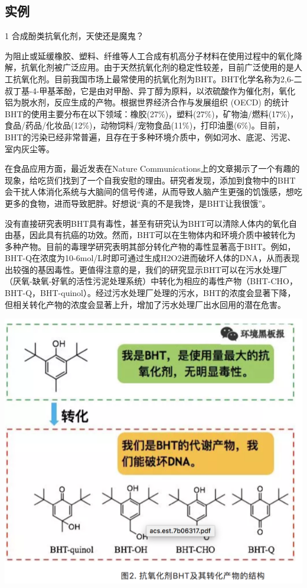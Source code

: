 \documentclass[]{book}
\begin{document}
\subsection{实例}

1 合成酚类抗氧化剂，天使还是魔鬼？

为阻止或延缓橡胶、塑料、纤维等人工合成有机高分子材料在使用过程中的氧化降解，抗氧化剂被广泛应用。由于天然抗氧化剂的稳定性较差，目前广泛使用的是人工抗氧化剂。目前我国市场上最常使用的抗氧化剂为BHT。BHT化学名称为2,6-二叔丁基-4-甲基苯酚，它是由对甲酚、异丁醇为原料，以浓硫酸作为催化剂，氧化铝为脱水剂，反应生成的产物。根据世界经济合作与发展组织
(OECD)
的统计BHT的使用主要分布在以下领域：橡胶(27\%)，塑料(27\%)，矿物油/燃料(17\%)，食品/药品/化妆品(12\%)，动物饲料/宠物食品(11\%)，打印油墨(6\%)。目前，BHT的污染已经非常普遍，且存在于多种环境介质中，例如河水、底泥、污泥、室内灰尘等。

在食品应用方面，最近发表在Nature
Communications上的文章揭示了一个有趣的现象，给吃货们找到了一个自我安慰的理由。研究者发现，添加到食物中的BHT会干扰人体消化系统与大脑间的信号传递，从而导致人脑产生更强的饥饿感，想吃更多的食物，进而导致肥胖。好想说``真的不是我馋，是BHT让我很饿''。

没有直接研究表明BHT具有毒性，甚至有研究认为BHT可以清除人体内的氧化自由基，因此具有抗癌的功效。然而，BHT可以在生物体内和环境介质中被转化为多种产物。目前的毒理学研究表明其部分转化产物的毒性显著高于BHT。例如，BHT-Q在浓度为10-6mol/L时即可通过生成H2O2进而破坏人体的DNA，从而表现出较强的基因毒性。更值得注意的是，我们的研究显示BHT可以在污水处理厂（厌氧-缺氧-好氧的活性污泥处理系统）中转化为相应的毒性产物（BHT-CHO，BHT-Q，BHT-quinol）。经过污水处理厂处理的污水，BHT的浓度会显著下降，但相关转化产物的浓度会显著上升，增加了污水处理厂出水回用的潜在危害。

\includegraphics[width=8.33in]{images/epc2}
\end{document}
